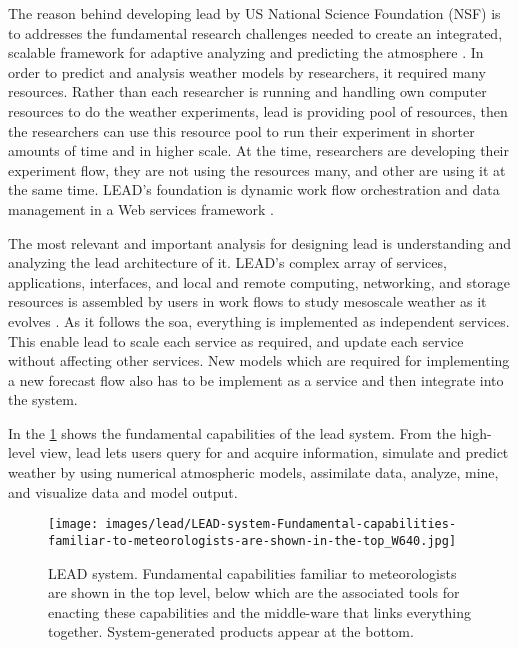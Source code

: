 \documentclass[a4paper,oneside,12pt]{report}
\begin{document}
The reason behind developing \acrfull{lead} by US National Science Foundation (NSF)  is to addresses the fundamental research challenges needed to create an integrated, scalable framework for adaptive analyzing and predicting the atmosphere \cite{Droegemeier2005Service-OrientedWeather}. In order to predict and analysis weather models by researchers, it required many resources. Rather than each researcher is running and handling own computer resources to do the weather experiments, \acrshort{lead} is providing pool of resources, then the researchers can use this resource pool to run their experiment in shorter amounts of time and in higher scale. At the time, researchers are developing their experiment flow, they are not using the resources many, and other are using it at the same time. LEAD's foundation is dynamic work flow orchestration and data management in a Web services framework \cite{Droegemeier2005Service-OrientedWeather}.

The most relevant and important analysis for designing \acrshort{lead} is understanding and analyzing the \acrfull{lead} architecture of it. LEAD's complex array of services, applications, interfaces, and local and remote computing, networking, and storage resources is assembled by users in work flows to study mesoscale weather as it evolves \cite{Droegemeier2005Service-OrientedWeather}. As it follows the \acrshort{soa}, everything is implemented as independent services. This enable \acrshort{lead} to scale each service as required, and update each service without affecting other services. New models which are required for implementing a new forecast flow also has to be implement as a service and then integrate into the system.

In the \ref{fi:lead_system} shows the fundamental capabilities of the \acrshort{lead} system. 
From the high-level view, \acrshort{lead} lets users query for and acquire information, simulate and predict weather by using numerical atmospheric models, assimilate data, analyze, mine, and visualize data and model output.

\begin{figure}[htp]
    \centering
    \texttt{[image: images/lead/LEAD-system-Fundamental-capabilities-familiar-to-meteorologists-are-shown-in-the-top\_W640.jpg]}\\
    \caption{LEAD system. Fundamental capabilities familiar to meteorologists are shown in the top level, below which are the associated tools for enacting these capabilities and the middle-ware that links everything together. System-generated products appear at the bottom. \cite{Droegemeier2005Service-OrientedWeather} }
    \label{fi:lead_system}
\end{figure}
\end{document}
